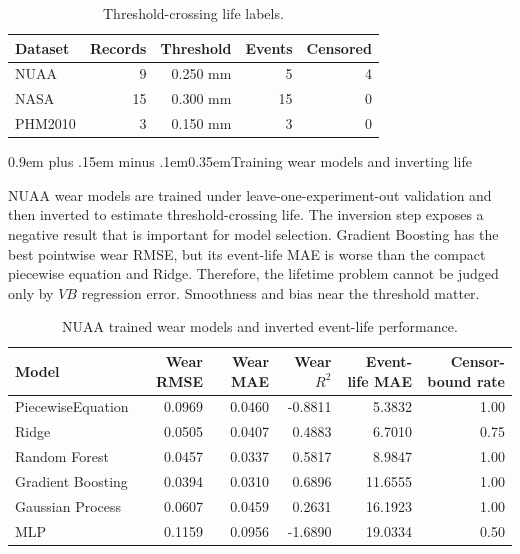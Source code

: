 \documentclass[10pt]{article}
\makeatletter
\newcommand{\vb}{V\!B}
\renewcommand\subsection{\@startsection{subsection}{2}{0pt}%
  {0.9em plus .15em minus .1em}{0.35em}{\normalfont\small\bfseries}}
\makeatother
\begin{document}
\begin{table}[!htbp]
  \centering
  \caption{Threshold-crossing life labels.}
  \label{tab:life-labels}
  \scriptsize
  \begin{tabular}{lrrrr}
    \toprule
    Dataset & Records & Threshold & Events & Censored \\
    \midrule
    NUAA & 9 & 0.250 mm & 5 & 4 \\
    NASA & 15 & 0.300 mm & 15 & 0 \\
    PHM2010 & 3 & 0.150 mm & 3 & 0 \\
    \bottomrule
  \end{tabular}
\end{table}

\subsection{Training wear models and inverting life}

NUAA wear models are trained under leave-one-experiment-out validation and then inverted to estimate threshold-crossing life. The inversion step exposes a negative result that is important for model selection. Gradient Boosting has the best pointwise wear RMSE, but its event-life MAE is worse than the compact piecewise equation and Ridge. Therefore, the lifetime problem cannot be judged only by \(\vb\) regression error. Smoothness and bias near the threshold matter.

\begin{table}[!t]
  \centering
  \caption{NUAA trained wear models and inverted event-life performance.}
  \label{tab:wear-life-benchmark}
  \footnotesize
  \begin{tabular}{lrrrrr}
    \toprule
    Model & Wear RMSE & Wear MAE & Wear \(R^2\) & Event-life MAE & Censor-bound rate \\
    \midrule
    PiecewiseEquation & 0.0969 & 0.0460 & -0.8811 & 5.3832 & 1.00 \\
    Ridge & 0.0505 & 0.0407 & 0.4883 & 6.7010 & 0.75 \\
    Random Forest & 0.0457 & 0.0337 & 0.5817 & 8.9847 & 1.00 \\
    Gradient Boosting & 0.0394 & 0.0310 & 0.6896 & 11.6555 & 1.00 \\
    Gaussian Process & 0.0607 & 0.0459 & 0.2631 & 16.1923 & 1.00 \\
    MLP & 0.1159 & 0.0956 & -1.6890 & 19.0334 & 0.50 \\
    \bottomrule
  \end{tabular}
\end{table}
\end{document}
